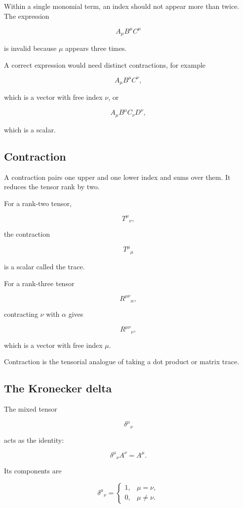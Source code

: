 Within a single monomial term, an index should not appear more than twice. The expression

\[
A_{\mu}B^{\mu}C^{\mu}
\]

is invalid because \(\mu\) appears three times.

A correct expression would need distinct contractions, for example

\[
A_{\mu}B^{\mu}C^{\nu},
\]

which is a vector with free index \(\nu\), or

\[
A_{\mu}B^{\mu}C_{\nu}D^{\nu},
\]

which is a scalar.

\subsection{Contraction}

A contraction pairs one upper and one lower index and sums over them. It reduces the tensor rank by two.

For a rank-two tensor,

\[
T^{\mu}{}_{\nu},
\]

the contraction

\[
\boxed{
T^{\mu}{}_{\mu}
}
\]

is a scalar called the trace.

For a rank-three tensor

\[
R^{\mu\nu}{}_{\alpha},
\]

contracting \(\nu\) with \(\alpha\) gives

\[
R^{\mu\nu}{}_{\nu},
\]

which is a vector with free index \(\mu\).

Contraction is the tensorial analogue of taking a dot product or matrix trace.

\subsection{The Kronecker delta}

The mixed tensor

\[
\delta^{\mu}{}_{\nu}
\]

acts as the identity:

\[
\boxed{
\delta^{\mu}{}_{\nu}A^{\nu}
=
A^{\mu}
}.
\]

Its components are

\[
\delta^{\mu}{}_{\nu}
=
\begin{cases}
1,&\mu=\nu,\\
0,&\mu\neq\nu.
\end{cases}
\]

